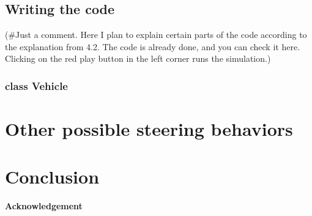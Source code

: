 \documentclass[10pt,twoside,slovak,a4paper]{article}
\begin{document}
\subsection{Writing the code } \label{code} 

(#Just a comment. Here I plan to explain certain parts of the code according to the explanation from 4.2. The code is already done, and you can check it here. Clicking on the red play button in the left corner runs the simulation.)

\subsubsection{class Vehicle} \label{class vehicle} 

\section{Other possible steering behaviors} \label{other} 

\section{Conclusion} \label{coclusion} 

\textbf{Acknowledgement} \par
{}



 
\end{document}
